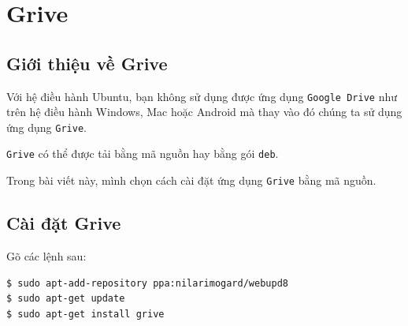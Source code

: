 \chapter{Grive}
\section{Giới thiệu về Grive}
\begin{list}{--}{}
\item Với hệ điều hành Ubuntu, bạn không sử dụng được ứng dụng \verb|Google Drive| như trên hệ điều hành Windows, Mac hoặc Android mà thay vào đó chúng ta sử dụng ứng dụng \verb|Grive|.
\item \verb|Grive| có thể được tải bằng mã nguồn hay bằng gói \verb|deb|.
\item Trong bài viết này, mình chọn cách cài đặt ứng dụng \verb|Grive| bằng mã nguồn.
\end{list}
\section{Cài đặt Grive}
\begin{list}{--}{}
\item[] Gõ các lệnh sau:
\begin{lstlisting}[language=bash]
$ sudo apt-add-repository ppa:nilarimogard/webupd8
$ sudo apt-get update
$ sudo apt-get install grive
\end{lstlisting}
\end{list}
